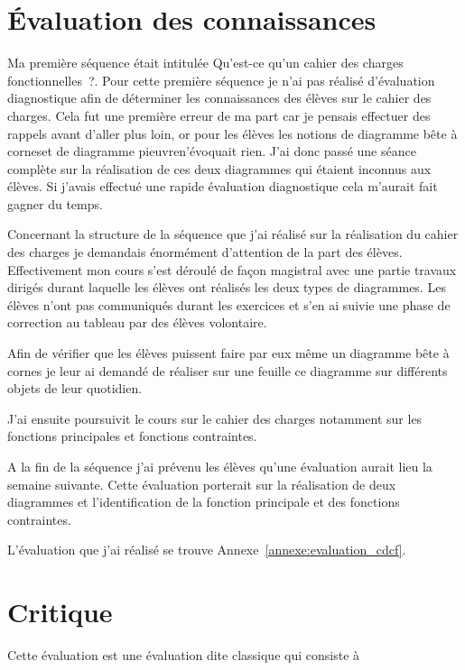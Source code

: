 
\section{Évaluation des connaissances}

Ma première séquence était intitulée \og Qu'est-ce qu'un cahier des charges fonctionnelles~?\fg. 
Pour cette première séquence je n'ai pas réalisé d'évaluation diagnostique afin de déterminer les connaissances des élèves sur le cahier des charges.
Cela fut une première erreur de ma part car je pensais effectuer des rappels avant d'aller plus loin, or pour les élèves les notions de \og diagramme bête à cornes\fg et de \og diagramme pieuvre\fg n'évoquait rien. J'ai donc passé une séance complète sur la réalisation de ces deux diagrammes qui étaient inconnus aux élèves.
Si j'avais effectué une rapide évaluation diagnostique cela m'aurait fait gagner du temps.

Concernant la structure de la séquence que j'ai réalisé sur la réalisation du cahier des charges je demandais énormément d'attention de la part des élèves.
Effectivement mon cours s'est déroulé de façon magistral avec une partie travaux dirigés durant laquelle les élèves ont réalisés les deux types de diagrammes.
Les élèves n'ont pas communiqués durant les exercices et s'en ai suivie une phase de correction au tableau par des élèves volontaire.

Afin de vérifier que les élèves puissent faire par eux même un diagramme bête à cornes je leur ai demandé de réaliser sur une feuille ce diagramme sur différents objets de leur quotidien.

J'ai ensuite poursuivit le cours sur le cahier des charges notamment sur les fonctions principales et fonctions contraintes.

A la fin de la séquence j'ai prévenu les élèves qu'une évaluation aurait lieu la semaine suivante. Cette évaluation porterait sur la réalisation de deux diagrammes et l'identification de la fonction principale et des fonctions contraintes.

L'évaluation que j'ai réalisé se trouve Annexe~\ref{annexe:evaluation_cdcf}.

\section{Critique}

Cette évaluation est une évaluation dite \og classique \fg qui consiste à 

